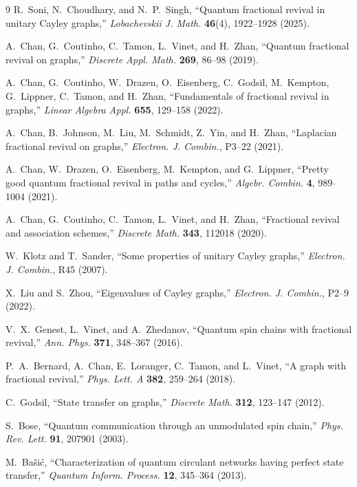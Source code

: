 \documentclass[12pt]{amsart}
\begin{document}
\begin{thebibliography}{9}
R.~Soni, N.~Choudhary, and N.~P.~Singh,
``Quantum fractional revival in unitary Cayley graphs,''
\textit{Lobachevskii J. Math.} \textbf{46}(4), 1922--1928 (2025).

A.~Chan, G.~Coutinho, C.~Tamon, L.~Vinet, and H.~Zhan,
``Quantum fractional revival on graphs,''
\textit{Discrete Appl. Math.} \textbf{269}, 86--98 (2019).

A.~Chan, G.~Coutinho, W.~Drazen, O.~Eisenberg, C.~Godsil, M.~Kempton, G.~Lippner,
C.~Tamon, and H.~Zhan,
``Fundamentals of fractional revival in graphs,''
\textit{Linear Algebra Appl.} \textbf{655}, 129--158 (2022).

A.~Chan, B.~Johnson, M.~Liu, M.~Schmidt, Z.~Yin, and H.~Zhan,
``Laplacian fractional revival on graphs,''
\textit{Electron. J. Combin.}, P3--22 (2021).

A.~Chan, W.~Drazen, O.~Eisenberg, M.~Kempton, and G.~Lippner,
``Pretty good quantum fractional revival in paths and cycles,''
\textit{Algebr. Combin.} \textbf{4}, 989--1004 (2021).

A.~Chan, G.~Coutinho, C.~Tamon, L.~Vinet, and H.~Zhan,
``Fractional revival and association schemes,''
\textit{Discrete Math.} \textbf{343}, 112018 (2020).

W.~Klotz and T.~Sander,
``Some properties of unitary Cayley graphs,''
\textit{Electron. J. Combin.}, R45 (2007).

X.~Liu and S.~Zhou,
``Eigenvalues of Cayley graphs,''
\textit{Electron. J. Combin.}, P2--9 (2022).

V.~X.~Genest, L.~Vinet, and A.~Zhedanov,
``Quantum spin chains with fractional revival,''
\textit{Ann. Phys.} \textbf{371}, 348--367 (2016).

P.~A.~Bernard, A.~Chan, E.~Loranger, C.~Tamon, and L.~Vinet,
``A graph with fractional revival,''
\textit{Phys. Lett. A} \textbf{382}, 259--264 (2018).

C.~Godsil,
``State transfer on graphs,''
\textit{Discrete Math.} \textbf{312}, 123--147 (2012).

S.~Bose,
``Quantum communication through an unmodulated spin chain,''
\textit{Phys. Rev. Lett.} \textbf{91}, 207901 (2003).

M.~Ba\v{s}i\'{c},
``Characterization of quantum circulant networks having perfect state transfer,''
\textit{Quantum Inform. Process.} \textbf{12}, 345--364 (2013).


\end{thebibliography}
\end{document}
